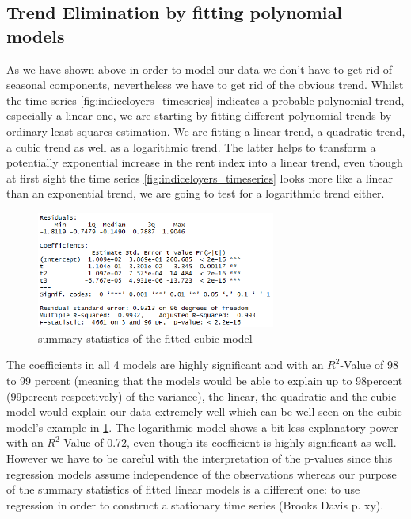 \documentclass[11pt,a4paper]{article}
\begin{document}
\subsection{Trend Elimination by fitting polynomial models}
As we have shown above in order to model our data we don't have to get rid of seasonal components, nevertheless we have to get rid of the obvious trend. Whilst the time series \ref{fig:indiceloyers_timeseries} indicates a probable polynomial trend, especially a linear one, we are starting by fitting different polynomial trends by ordinary least squares estimation. We are fitting a linear trend, a quadratic trend, a cubic trend as well as a logarithmic trend. The latter  helps to transform a potentially exponential increase in the rent index into a linear trend, even though at first sight the time series \ref{fig:indiceloyers_timeseries} looks more like a linear than an exponential trend, we are going to test for a logarithmic trend either.
\\
\begin{figure}[!htb]
\centering
\includegraphics[angle=0,
width=0.7\textwidth]{summary_cubicmodel}
\caption{summary statistics of the fitted cubic model\label{fig:summary_cubicmodel}}
\end{figure}
The coefficients in all 4 models are highly significant and with an $R^2$-Value of 98 to 99 percent (meaning that the models would be able to explain up to 98percent (99percent respectively) of the variance), the linear, the quadratic and the cubic model would explain our data extremely well which can be well seen on the cubic model's example in \ref{fig:summary_cubicmodel}. The logarithmic model shows a bit less explanatory power with an $R^2$-Value of 0.72, even though its coefficient is highly significant as well. However we have to be careful with the interpretation of the p-values since this regression models assume independence of the observations whereas our purpose of the summary statistics of fitted linear models is a different one: to use regression in order to construct a stationary time series (Brooks Davis p. xy). 
\end{document}
